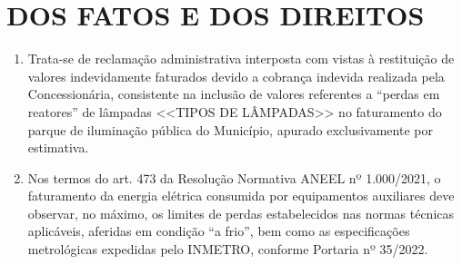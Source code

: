 \newcommand{\tipoRequerimento}{cobrança indevida por perda nos reatores de lâmpadas}

\newif\ifperdaVapor
\perdaVaporfalse

\newif\ifperdaFluorescente
\perdaFluorescentefalse

\section{DOS FATOS E DOS DIREITOS}

\begin{enumerate}[resume]
\item 
Trata-se de reclamação administrativa interposta com vistas à restituição de valores indevidamente faturados devido a cobrança indevida realizada pela Concessionária, consistente na inclusão de valores referentes a “perdas em reatores” de lâmpadas <<TIPOS DE LÂMPADAS>> no faturamento do parque de iluminação pública do Município, apurado exclusivamente por estimativa.

\item 
Nos termos do art. 473 da Resolução Normativa ANEEL nº 1.000/2021, o faturamento da energia elétrica consumida por equipamentos auxiliares deve observar, no máximo, os limites de perdas estabelecidos nas normas técnicas aplicáveis, aferidas em condição “a frio”, bem como as especificações metrológicas expedidas pelo INMETRO, conforme Portaria nº 35/2022.

\ifperdaVapor
\item %
<<PARAGRAFO_NORMAS_VAPOR>>
\fi

\ifperdaFluorescente
\item %
No que se refere às lâmpadas fluorescentes, inexiste norma técnica da ABNT ou previsão regulatória que autorize a imputação de perdas adicionais de reator para fins de faturamento. Ademais, no caso específico das lâmpadas fluorescentes compactas, o reator integra o próprio conjunto do equipamento, razão pela qual a potência nominal declarada já contempla eventuais perdas inerentes ao seu funcionamento. Assim, a inclusão de valores a título de “perdas de reator” no faturamento revela-se desprovida de base técnica, normativa e jurídica, configurando cobrança indevida, em afronta direta ao art. 473 da REN nº 1.000/2021 e aos princípios da legalidade e da modicidade tarifária. 
\fi


\end{enumerate}
